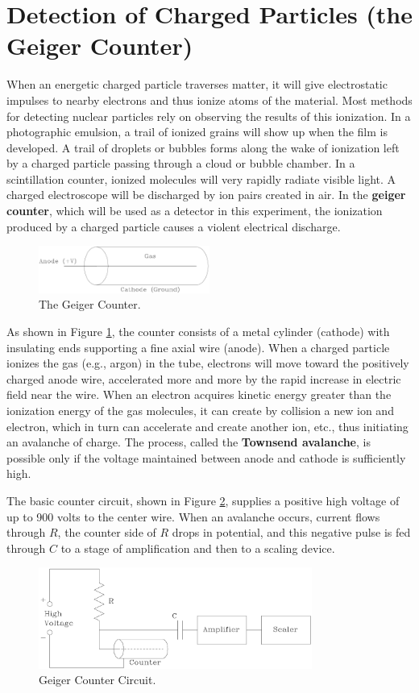 \section{Detection of Charged Particles (the Geiger Counter)}
When an energetic charged particle traverses matter, it will give electrostatic impulses to nearby electrons and thus ionize atoms of the material. Most methods for detecting nuclear particles rely on observing the results of this ionization. In a photographic emulsion, a trail of ionized grains will show up when the film is developed. A trail of droplets or bubbles forms along the wake of ionization left by a charged particle passing through a cloud or bubble chamber. In a scintillation counter, ionized molecules will very rapidly radiate visible light. A charged electroscope will be discharged by ion pairs created in air. In the \textbf{geiger counter}, which will be used as a detector in this experiment, the ionization produced by a charged particle causes a violent electrical discharge.
\begin{figure}[h]
\centering
\includegraphics[width=0.5\textwidth]{./Exp10/pic/image3.png}
\caption{The Geiger Counter.}
\label{fig:counter}
\end{figure} 

As shown in Figure {\ref{fig:counter}}, the counter consists of a metal cylinder (cathode) with insulating ends supporting a fine axial wire (anode). When a charged particle ionizes the gas (e.g., argon) in the tube, electrons will move toward the positively charged anode wire, accelerated more and more by the rapid increase in electric field near the wire. When an electron acquires kinetic energy greater than the ionization energy of the gas molecules, it can create by collision a new ion and electron, which in turn can accelerate and create another ion, etc., thus initiating an avalanche of charge. The process, called the \textbf{Townsend avalanche}, is possible only if the voltage maintained between anode and cathode is sufficiently high.\myskip

The basic counter circuit, shown in Figure {\ref{fig:geiger}}, supplies a positive high voltage of up to 900 volts to the center wire. When an avalanche occurs, current flows through $R$, the counter side of $R$ drops in potential, and this negative pulse is fed through $C$ to a stage of amplification and then to a scaling device.
\begin{figure}[h]
\centering
\includegraphics[width=0.8\textwidth]{./Exp10/pic/image4.png}
\caption{Geiger Counter Circuit.}
\label{fig:geiger}
\end{figure} 

